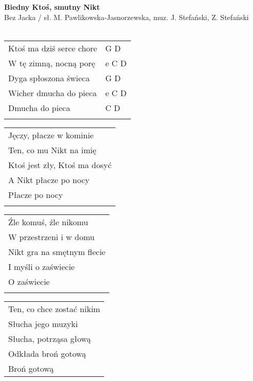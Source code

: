 \documentclass[a5paper]{article}
\begin{document}


\noindent
\fontsize{12pt}{15pt}\selectfont
\textbf{Biedny Ktoś, smutny Nikt} \\
\fontsize{8pt}{10pt}\selectfont
Bez Jacka / sł. M. Pawlikowska-Jasnorzewska, muz. J. Stefański, Z. Stefański \\ \\
\fontsize{10pt}{12pt}\selectfont
{}
\begin{tabular}{@{}p{7cm}p{3cm}@{}}
\noindent
Ktoś ma dziś serce chore & G D\\
W tę zimną, nocną porę & e C D \\
Dyga spłoszona świeca & G D \\
Wicher dmucha do pieca & e C D \\
Dmucha do pieca & C D \\ \\
\end{tabular}

\noindent
\begin{tabular}{@{}p{9.5cm}@{}}
Jęczy, płacze w kominie \\
Ten, co mu Nikt na imię \\
Ktoś jest zły, Ktoś ma dosyć \\
A Nikt płacze po nocy \\
Płacze po nocy \\ \\
\end{tabular}

\noindent
\begin{tabular}{@{}p{9.5cm}@{}}
Źle komuś, źle nikomu \\
W przestrzeni i w domu \\
Nikt gra na smętnym flecie \\
I myśli o zaświecie \\ 
O zaświecie \\ \\
\end{tabular}

\noindent
\begin{tabular}{@{}p{9.5cm}@{}}
Ten, co chce zostać nikim \\ 
Słucha jego muzyki \\
Słucha, potrząsa głową \\
Odkłada broń gotową \\
Broń gotową
\end{tabular}
\end{document}
